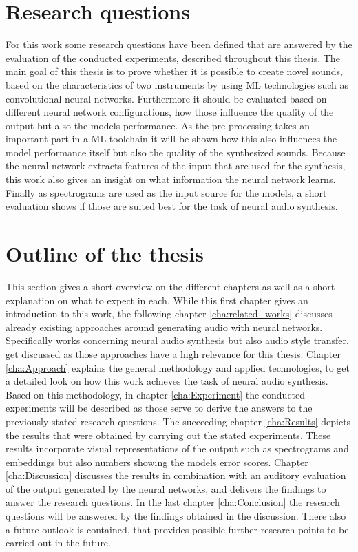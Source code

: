 \section{Research questions}
For this work some research questions have been defined that are answered by the evaluation of the conducted experiments, described throughout this thesis. The main goal of this thesis is to prove whether it is possible to create novel sounds, based on the characteristics of two instruments by using ML technologies such as convolutional neural networks. Furthermore it should be evaluated based on different neural network configurations, how those influence the quality of the output but also the models performance. As the pre-processing takes an important part in a ML-toolchain it will be shown how this also influences the model performance itself but also the quality of the synthesized sounds. Because the neural network extracts features of the input that are used for the synthesis, this work also gives an insight on what information the neural network learns. Finally as spectrograms are used as the input source for the models, a short evaluation shows if those are suited best for the task of neural audio synthesis.

\section{Outline of the thesis}
This section gives a short overview on the different chapters as well as a short explanation on what to expect in each.
While this first chapter gives an introduction to this work, the following chapter \ref{cha:related_works} discusses already existing approaches around generating audio with neural networks. Specifically works concerning neural audio synthesis but also audio style transfer, get discussed as those approaches have a high relevance for this thesis. Chapter \ref{cha:Approach} explains the general methodology and applied technologies, to get a detailed look on how this work achieves the task of neural audio synthesis. Based on this methodology, in chapter \ref{cha:Experiment} the conducted experiments will be described as those serve to derive the answers to the previously stated research questions. The succeeding chapter \ref{cha:Results} depicts the results that were obtained by carrying out the stated experiments. These results incorporate visual representations of the output such as spectrograms and embeddings but also numbers showing the models error scores. Chapter \ref{cha:Discussion} discusses the results in combination with an auditory evaluation of the output generated by the neural networks, and delivers the findings to answer the research questions. In the last chapter \ref{cha:Conclusion} the research questions will be answered by the findings obtained in the discussion. There also a future outlook is contained, that provides possible further research points to be carried out in the future.